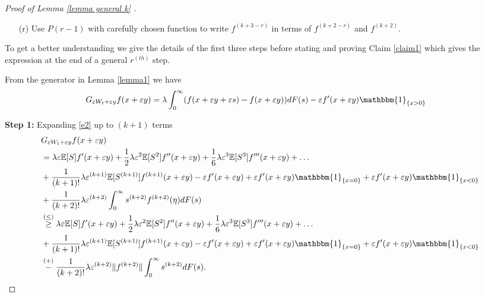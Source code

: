 \documentclass[11pt,letterpaper,reqno]{article}
\theoremstyle{thmstyleone}%
\theoremstyle{thmstyletwo}%
\theoremstyle{thmstylethree}%
\numberwithin{equation}{section}
\begin{document}
\begin{proof}[Proof of Lemma \ref{lemma general k} ]
\begin{enumerate}
For proving $P(2)$ the second step gave the third derivative in terms of  the second and fourth derivative, and that was all that was required to prove $P(2)$. Now for proving $P(k)$ we will have to write $f^{(3)}, f^{(4)}, \ldots, f^{(k+1)}$ in terms of $f^{(2)}$ and $f^{(k+2)}$. For this we will need $k-2$ more steps. The general $r^{th}$ step is given as follows for $3 \leq r \leq k$.
\\
    \item [(r)]Use $P(r-1)$ with carefully chosen function to write $f^{(k+3-r)}$ in terms of $f^{(k+2-r)}$ and $f^{(k+2)}$. %
\end{enumerate}
To get a better understanding we give the details of the first three steps before stating and proving Claim \ref{claim1} which gives the expression at the end of a general $r^{(th)}$ step.

From the generator in Lemma \ref{lemma1} we have 
\begin{align}\label{e2}
    G_{\varepsilon W_t+\varepsilon y}f(x+\varepsilon y)&=\lambda \int_0^\infty (f(x+\varepsilon y +\varepsilon s)-f(x+\varepsilon y))dF(s)-\varepsilon f'(x+\varepsilon y)\mathbbm{1}_{\{x>0\}}
\end{align}

\textbf{Step 1: } 
Expanding \eqref{e2} up to $(k+1)$ terms
\begin{align}\label{eqstep1}
       &G_{\varepsilon W_t+\varepsilon y}f(x+\varepsilon y) \nonumber\\ &=\lambda \varepsilon \mathbb E[S]f'(x+\varepsilon y)+\frac{1}{2}\lambda \varepsilon^2 \mathbb E[S^2]f''(x+\varepsilon y)+\frac{1}{6}\lambda \varepsilon^3 \mathbb E[S^3]f'''(x+\varepsilon y)+ \ldots \nonumber\\
       &+\frac{1}{(k+1)!}\lambda \varepsilon^{(k+1)}\mathbb E[S^{(k+1)}]f^{(k+1)}(x+\varepsilon y)-\varepsilon f'(x+\varepsilon y)+\varepsilon f'(x+\varepsilon y)\mathbbm{1}_{\{x=0\}}+\varepsilon f'(x+\varepsilon y)\mathbbm{1}_{\{x<0\}}\nonumber\\
       &+\frac{1}{(k+2)!}\lambda \varepsilon^{(k+2)} \int_0^\infty s^{(k+2)} f^{(k+2)}(\eta)dF(s)\nonumber\\
       &\stackrel{(\leq)}{\geq}  \lambda \varepsilon \mathbb E[S]f'(x+\varepsilon y)+\frac{1}{2}\lambda \varepsilon^2 \mathbb E[S^2]f''(x+\varepsilon y)+\frac{1}{6}\lambda \varepsilon^3 \mathbb E[S^3]f'''(x+\varepsilon y)+ \ldots\nonumber\\
       &+\frac{1}{(k+1)!}\lambda \varepsilon^{(k+1)}\mathbb E[S^{(k+1)}]f^{(k+1)}(x+\varepsilon y)-\varepsilon f'(x+\varepsilon y)+\varepsilon f'(x+\varepsilon y)\mathbbm{1}_{\{x=0\}}+\varepsilon f'(x+\varepsilon y)\mathbbm{1}_{\{x<0\}}\nonumber\\
       &\stackrel{(+)}{-}\frac{1}{(k+2)!}\lambda \varepsilon^{(k+2)} \|f^{(k+2)}\|\int_0^\infty s^{(k+2)} dF(s).
\end{align}


\end{proof}
\end{document}
